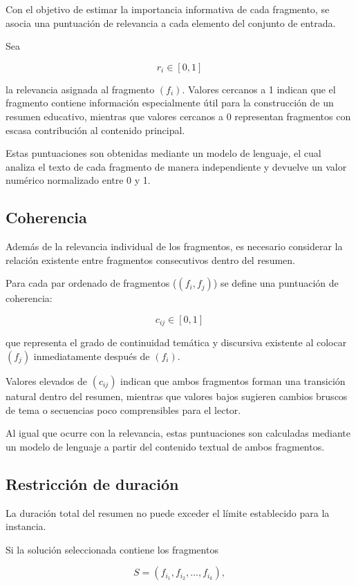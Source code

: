 \documentclass[12pt,a4paper]{article}
\begin{document}
Con el objetivo de estimar la importancia informativa de cada fragmento, se asocia una puntuación de relevancia a cada elemento del conjunto de entrada.

Sea

\[
r_i \in [0,1]
\]

la relevancia asignada al fragmento $(f_i)$. Valores cercanos a 1 indican que el fragmento contiene información especialmente útil para la construcción de un resumen educativo, mientras que valores cercanos a 0 representan fragmentos con escasa contribución al contenido principal.

Estas puntuaciones son obtenidas mediante un modelo de lenguaje, el cual analiza el texto de cada fragmento de manera independiente y devuelve un valor numérico normalizado entre 0 y 1.

\subsection{Coherencia}

Además de la relevancia individual de los fragmentos, es necesario considerar la relación existente entre fragmentos consecutivos dentro del resumen.

Para cada par ordenado de fragmentos ($(f_i,f_j)$) se define una puntuación de coherencia:

\[
c_{ij}\in[0,1]
\]

que representa el grado de continuidad temática y discursiva existente al colocar $(f_j)$ inmediatamente después de $(f_i)$.

Valores elevados de $(c_{ij})$ indican que ambos fragmentos forman una transición natural dentro del resumen, mientras que valores bajos sugieren cambios bruscos de tema o secuencias poco comprensibles para el lector.

Al igual que ocurre con la relevancia, estas puntuaciones son calculadas mediante un modelo de lenguaje a partir del contenido textual de ambos fragmentos.

\subsection{Restricción de duración}

La duración total del resumen no puede exceder el límite establecido para la instancia.

Si la solución seleccionada contiene los fragmentos

\[
S=(f_{i_1},f_{i_2},\ldots,f_{i_k}),
\]
\end{document}
